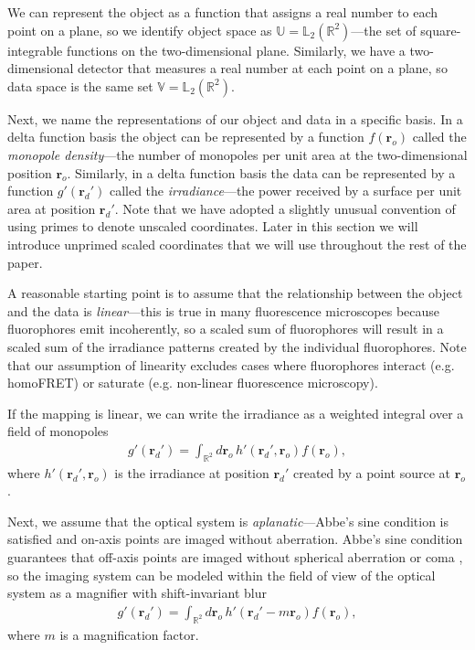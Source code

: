 \documentclass[]{osa-article}
\providecommand{\ro}{\mathbf{\mathbf{r}}_o}
\providecommand{\rd}{\mathbf{r}_d}
\providecommand{\mbb}[1]{\mathbb{#1}}
\begin{document}
We can represent the object as a function that assigns a real number to each
point on a plane, so we identify object space as
$\mbb{U} = \mbb{L}_2(\mbb{R}^2)$---the set of square-integrable functions on the
two-dimensional plane. Similarly, we have a two-dimensional detector that
measures a real number at each point on a plane, so data space is the same set
$\mbb{V} = \mbb{L}_2(\mbb{R}^2)$.

Next, we name the representations of our object and data in a specific basis. In
a delta function basis the object can be represented by a function $f(\ro)$
called the \textit{monopole density}---the number of monopoles per unit area at
the two-dimensional position $\ro$. Similarly, in a delta function basis the
data can be represented by a function $g'(\rd')$ called the
\textit{irradiance}---the power received by a surface per unit area at position
$\rd'$. Note that we have adopted a slightly unusual convention of using primes
to denote unscaled coordinates. Later in this section we will introduce unprimed
scaled coordinates that we will use throughout the rest of the
paper.

A reasonable starting point is to assume that the relationship between the
object and the data is \textit{linear}---this is true in many fluorescence
microscopes because fluorophores emit incoherently, so a scaled sum of
fluorophores will result in a scaled sum of the irradiance patterns created by
the individual fluorophores. Note that our assumption of linearity excludes
cases where fluorophores interact (e.g. homoFRET) or saturate (e.g. non-linear
fluorescence microscopy).

If the mapping is linear, we can write the irradiance as a weighted integral
over a field of monopoles
\begin{align}
g'(\rd') = \int_{\mbb{R}^2}d\ro\, h'(\rd',\ro)f(\ro), \label{eq:fwdmono}
\end{align}
where $h'(\rd', \ro{})$ is the irradiance at position $\rd'$ created by a
point source at $\ro$.

Next, we assume that the optical system is \textit{aplanatic}---Abbe's sine
condition is satisfied and on-axis points are imaged without aberration. Abbe's
sine condition guarantees that off-axis points are imaged without spherical
aberration or coma \cite[ch.~1]{mansuripur2009}, so the imaging system can
be modeled within the field of view of the optical system as a magnifier with
shift-invariant blur
\begin{align}
  g'(\rd') = \int_{\mbb{R}^2}d\ro\, h'(\rd' - m\ro)f(\ro), \label{eq:nonconv}
\end{align}
where $m$ is a magnification factor. 
\end{document}
